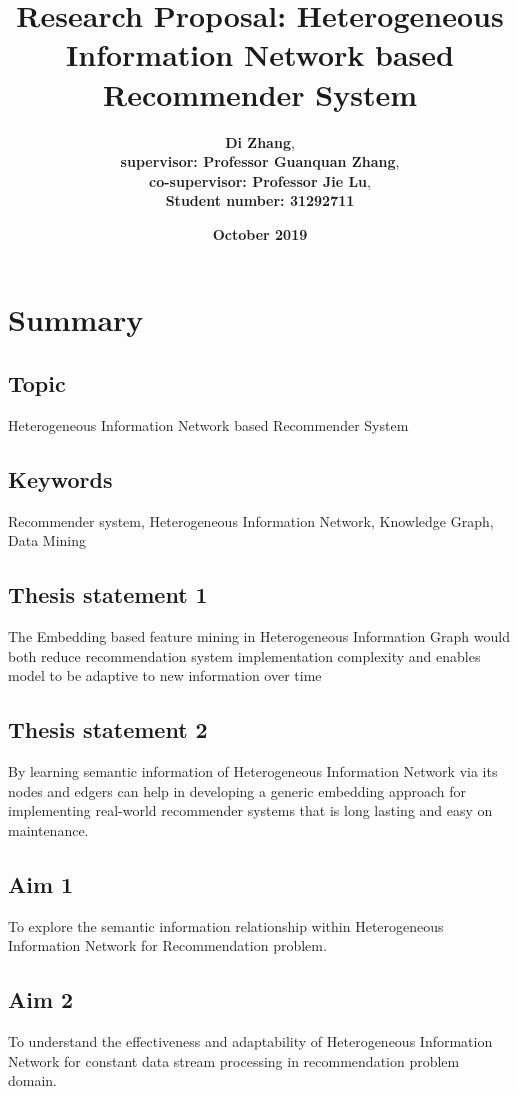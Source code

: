 \documentclass[12pt,a4 paper,title page]{article}
\title{Research Proposal: Heterogeneous Information Network based Recommender System}
\author{\large\textbf{Di Zhang}, \\
\textbf{supervisor: Professor Guanquan Zhang}, \\
\textbf{co-supervisor: Professor Jie Lu}, \\
\textbf{Student number: 31292711}}
\date{\Large{\textbf{October 2019}}}
\begin{document}
\sloppy
\maketitle
\hfill
\hfill

\section*{Summary}

\subsection*{Topic} Heterogeneous Information Network based Recommender System

\subsection*{Keywords} 

Recommender system, Heterogeneous Information Network, Knowledge Graph, Data Mining 

\subsection*{Thesis statement 1}
The Embedding based feature mining in Heterogeneous Information Graph would both reduce recommendation system implementation complexity and enables model to be adaptive to new information over time

\subsection*{Thesis statement 2}
By learning semantic information of Heterogeneous Information Network via its nodes and edgers can help in developing a generic embedding approach for implementing real-world recommender systems that is long lasting and easy on maintenance. 

\subsection*{Aim 1}
To explore the semantic information relationship within Heterogeneous Information Network for Recommendation problem.

\subsection*{Aim 2}
To understand the effectiveness and adaptability of Heterogeneous Information Network for constant data stream processing in recommendation problem domain. 
\end{document}
